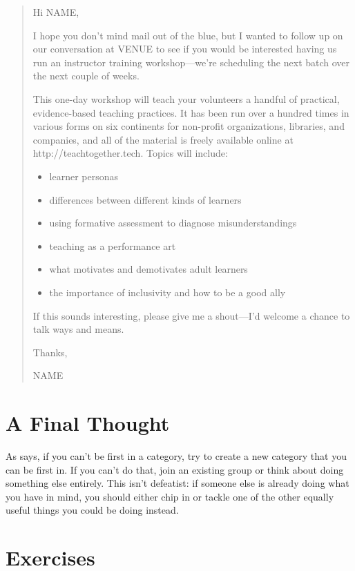 \begin{quote}

  \noindent
  Hi NAME,

  I hope you don't mind mail out of the blue,
  but I wanted to follow up on our conversation at VENUE
  to see if you would be interested having us run an instructor training workshop---we're
  scheduling the next batch over the next couple of weeks.

  This one-day workshop will teach your volunteers
  a handful of practical, evidence-based teaching practices.
  It has been run over a hundred times in various forms on six continents
  for non-profit organizations, libraries, and companies,
  and all of the material is freely available online at http://teachtogether.tech.
  Topics will include:

  \begin{itemize}
  \item learner personas
  \item differences between different kinds of learners
  \item using formative assessment to diagnose misunderstandings
  \item teaching as a performance art
  \item what motivates and demotivates adult learners
  \item the importance of inclusivity and how to be a good ally
  \end{itemize}
  
  If this sounds interesting,
  please give me a shout---I'd welcome a chance to talk ways and means.

  Thanks,

  NAME

\end{quote}

\section{A Final Thought}\label{s:marketing-final}

As \cite{Kuch2011} says,
if you can't be first in a category,
try to create a new category that you can be first in.
If you can't do that,
join an existing group or think about doing something else entirely.
This isn't defeatist:
if someone else is already doing what you have in mind,
you should either chip in or tackle one of the other equally useful things
you could be doing instead.

\section{Exercises}\label{s:marketing-exercises}

